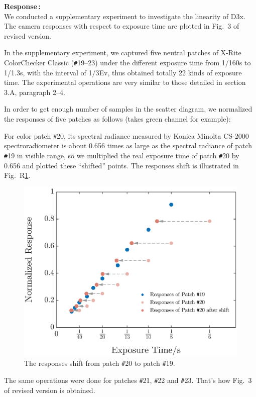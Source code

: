 \documentclass[12pt]{article}
\newcommand{\reply}[1]{\noindent \textbf{\fontseries{b}\selectfont Response\,:}\medskip\\#1\medskip\par}
\begin{document}
	\reply{
		We conducted a supplementary experiment to investigate the linearity of D3x. The camera responses with respect to exposure time are plotted in Fig.~3 of revised version.
		
		In the supplementary experiment, we captured five neutral patches of X-Rite ColorChecker Classic (\texttt{\#}19--23) under the different exposure time from 1/160s to 1/1.3s, with the interval of 1/3Ev, thus obtained totally 22 kinds of exposure time. The experimental operations are very similar to those detailed in section 3.A, paragraph 2--4.
		
		In order to get enough number of samples in the scatter diagram, we normalized the responses of five patches as follows (takes green channel for example):
		
		For color patch \texttt{\#}20, its spectral radiance measured by Konica Minolta CS-2000 spectroradiometer is about 0.656 times as large as the spectral radiance of patch \texttt{\#}19 in visible range, so we multiplied the real exposure time of patch \texttt{\#}20 by 0.656 and plotted these ``shifted'' points. The responses shift is illustrated in Fig.~R\ref{fig:ResponsesShift}.
		
		\begin{figure}[tbp]
			\centering
			\includegraphics[width=.65\linewidth]{ResponsesShift.eps}
			\caption{The responses shift from patch \texttt{\#}20 to patch \texttt{\#}19.}
			\label{fig:ResponsesShift}
		\end{figure}
		
		The same operations were done for patches \texttt{\#}21, \texttt{\#}22 and \texttt{\#}23. That's how Fig.~3 of revised version is obtained.
		
}
\end{document}
